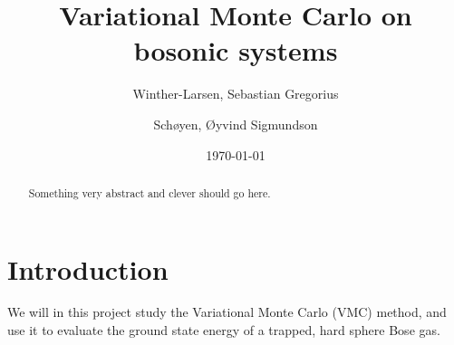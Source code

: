 \documentclass[
    a4paper, aps, twocolumn, floatfix, superscriptaddress]{revtex4-1}
\newcommand{\1}{\mathds{1}}
\begin{document}
\title{Variational Monte Carlo on bosonic systems}
\author{Winther-Larsen, Sebastian Gregorius}
\author{Schøyen, Øyvind Sigmundson}
\date{\today}

\begin{abstract}
    Something very abstract and clever should go here.
\end{abstract}

\maketitle

\section{Introduction}
    We will in this project study the Variational Monte Carlo (VMC) method, and
    use it to evaluate the ground state energy of a trapped, hard sphere Bose
    gas.
\end{document}
